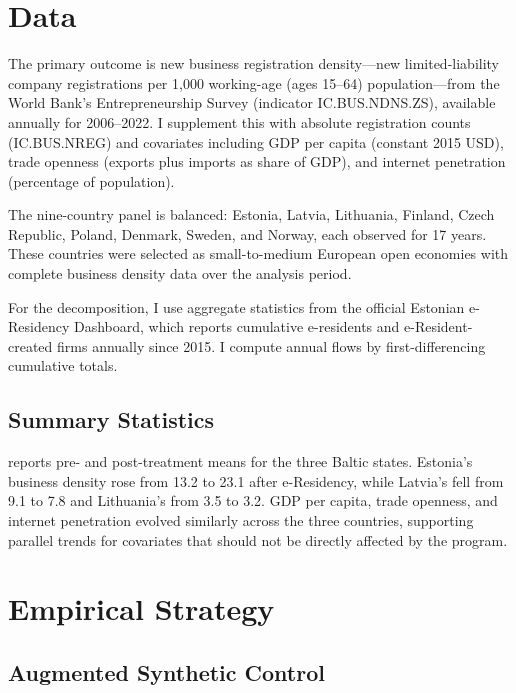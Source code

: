 \documentclass[12pt]{article}
\begin{document}
\section{Data}

The primary outcome is new business registration density---new limited-liability company registrations per 1,000 working-age (ages 15--64) population---from the World Bank's Entrepreneurship Survey (indicator IC.BUS.NDNS.ZS), available annually for 2006--2022. I supplement this with absolute registration counts (IC.BUS.NREG) and covariates including GDP per capita (constant 2015 USD), trade openness (exports plus imports as share of GDP), and internet penetration (percentage of population).

The nine-country panel is balanced: Estonia, Latvia, Lithuania, Finland, Czech Republic, Poland, Denmark, Sweden, and Norway, each observed for 17 years. These countries were selected as small-to-medium European open economies with complete business density data over the analysis period.

For the decomposition, I use aggregate statistics from the official Estonian e-Residency Dashboard, which reports cumulative e-residents and e-Resident-created firms annually since 2015. I compute annual flows by first-differencing cumulative totals.

\subsection{Summary Statistics}



 reports pre- and post-treatment means for the three Baltic states. Estonia's business density rose from 13.2 to 23.1 after e-Residency, while Latvia's fell from 9.1 to 7.8 and Lithuania's from 3.5 to 3.2. GDP per capita, trade openness, and internet penetration evolved similarly across the three countries, supporting parallel trends for covariates that should not be directly affected by the program.

\section{Empirical Strategy}

\subsection{Augmented Synthetic Control}
\end{document}
